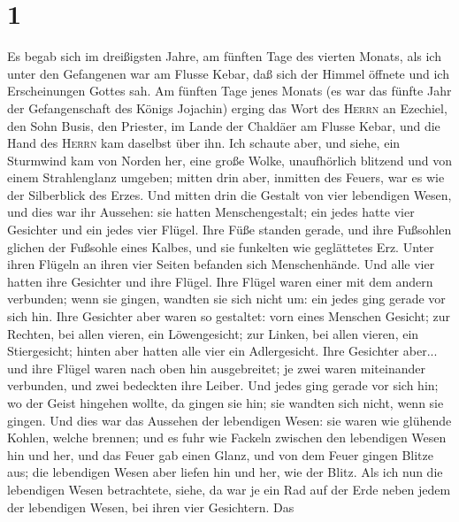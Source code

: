 \hypertarget{section}{%
\section{1}\label{section}}

 Es begab sich im dreißigsten Jahre, am fünften Tage des
vierten Monats, als ich unter den Gefangenen war am Flusse Kebar, daß
sich der Himmel öffnete und ich Erscheinungen Gottes sah. 
Am fünften Tage jenes Monats (es war das fünfte Jahr der Gefangenschaft
des Königs Jojachin)  erging das Wort des \textsc{Herrn}
an Ezechiel, den Sohn Busis, den Priester, im Lande der Chaldäer am
Flusse Kebar, und die Hand des \textsc{Herrn} kam daselbst über ihn.
 Ich schaute aber, und siehe, ein Sturmwind kam von Norden
her, eine große Wolke, unaufhörlich blitzend und von einem Strahlenglanz
umgeben; mitten drin aber, inmitten des Feuers, war es wie der
Silberblick des Erzes.  Und mitten drin die Gestalt von
vier lebendigen Wesen, und dies war ihr Aussehen: sie hatten
Menschengestalt;  ein jedes hatte vier Gesichter und ein
jedes vier Flügel.  Ihre Füße standen gerade, und ihre
Fußsohlen glichen der Fußsohle eines Kalbes, und sie funkelten wie
geglättetes Erz.  Unter ihren Flügeln an ihren vier Seiten
befanden sich Menschenhände. Und alle vier hatten ihre Gesichter und
ihre Flügel.  Ihre Flügel waren einer mit dem andern
verbunden; wenn sie gingen, wandten sie sich nicht um: ein jedes ging
gerade vor sich hin.  Ihre Gesichter aber waren so
gestaltet: vorn eines Menschen Gesicht; zur Rechten, bei allen vieren,
ein Löwengesicht; zur Linken, bei allen vieren, ein Stiergesicht; hinten
aber hatten alle vier ein Adlergesicht.  Ihre Gesichter
aber... und ihre Flügel waren nach oben hin ausgebreitet; je zwei waren
miteinander verbunden, und zwei bedeckten ihre Leiber. 
Und jedes ging gerade vor sich hin; wo der Geist hingehen wollte, da
gingen sie hin; sie wandten sich nicht, wenn sie gingen. 
Und dies war das Aussehen der lebendigen Wesen: sie waren wie glühende
Kohlen, welche brennen; und es fuhr wie Fackeln zwischen den lebendigen
Wesen hin und her, und das Feuer gab einen Glanz, und von dem Feuer
gingen Blitze aus;  die lebendigen Wesen aber liefen hin
und her, wie der Blitz.  Als ich nun die lebendigen Wesen
betrachtete, siehe, da war je ein Rad auf der Erde neben jedem der
lebendigen Wesen, bei ihren vier Gesichtern.  Das
